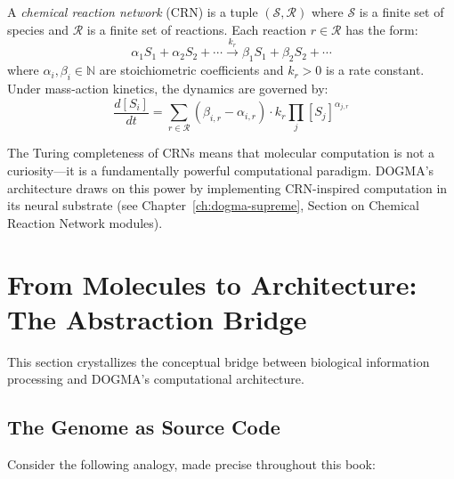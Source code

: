 \begin{definition}
\label{def:crn}
A \emph{chemical reaction network} (CRN) is a tuple $(\mathcal{S}, \mathcal{R})$ where $\mathcal{S}$ is a finite set of species and $\mathcal{R}$ is a finite set of reactions. Each reaction $r \in \mathcal{R}$ has the form:
\begin{equation}
\alpha_1 S_1 + \alpha_2 S_2 + \cdots \xrightarrow{k_r} \beta_1 S_1 + \beta_2 S_2 + \cdots
\end{equation}
where $\alpha_i, \beta_i \in \mathbb{N}$ are stoichiometric coefficients and $k_r > 0$ is a rate constant. Under mass-action kinetics, the dynamics are governed by:
\begin{equation}
\frac{d[S_i]}{dt} = \sum_{r \in \mathcal{R}} (\beta_{i,r} - \alpha_{i,r}) \cdot k_r \prod_{j} [S_j]^{\alpha_{j,r}}
\label{eq:mass-action}
\end{equation}
\end{definition}

The Turing completeness of CRNs means that molecular computation is not a curiosity---it is a fundamentally powerful computational paradigm. DOGMA's architecture draws on this power by implementing CRN-inspired computation in its neural substrate (see Chapter~\ref{ch:dogma-supreme}, Section on Chemical Reaction Network modules).

\section{From Molecules to Architecture: The Abstraction Bridge}
\label{sec:abstraction-bridge}

This section crystallizes the conceptual bridge between biological information processing and DOGMA's computational architecture.

\subsection{The Genome as Source Code}

Consider the following analogy, made precise throughout this book:

